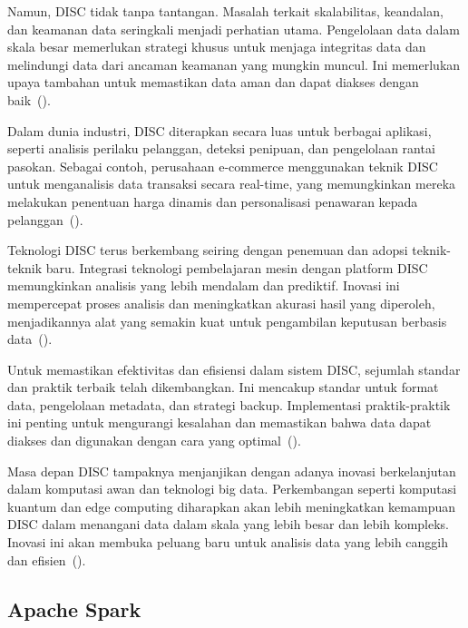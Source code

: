 Namun, DISC tidak tanpa tantangan. Masalah terkait skalabilitas, keandalan, dan keamanan data seringkali menjadi perhatian utama. Pengelolaan data dalam skala besar memerlukan strategi khusus untuk menjaga integritas data dan melindungi data dari ancaman keamanan yang mungkin muncul. Ini memerlukan upaya tambahan untuk memastikan data aman dan dapat diakses dengan baik~(\cite{hadoop2017}).

Dalam dunia industri, DISC diterapkan secara luas untuk berbagai aplikasi, seperti analisis perilaku pelanggan, deteksi penipuan, dan pengelolaan rantai pasokan. Sebagai contoh, perusahaan e-commerce menggunakan teknik DISC untuk menganalisis data transaksi secara real-time, yang memungkinkan mereka melakukan penentuan harga dinamis dan personalisasi penawaran kepada pelanggan~(\cite{chen2018}).

Teknologi DISC terus berkembang seiring dengan penemuan dan adopsi teknik-teknik baru. Integrasi teknologi pembelajaran mesin dengan platform DISC memungkinkan analisis yang lebih mendalam dan prediktif. Inovasi ini mempercepat proses analisis dan meningkatkan akurasi hasil yang diperoleh, menjadikannya alat yang semakin kuat untuk pengambilan keputusan berbasis data~(\cite{xu2020}).

Untuk memastikan efektivitas dan efisiensi dalam sistem DISC, sejumlah standar dan praktik terbaik telah dikembangkan. Ini mencakup standar untuk format data, pengelolaan metadata, dan strategi backup. Implementasi praktik-praktik ini penting untuk mengurangi kesalahan dan memastikan bahwa data dapat diakses dan digunakan dengan cara yang optimal~(\cite{rodriguez2019}).

Masa depan DISC tampaknya menjanjikan dengan adanya inovasi berkelanjutan dalam komputasi awan dan teknologi big data. Perkembangan seperti komputasi kuantum dan edge computing diharapkan akan lebih meningkatkan kemampuan DISC dalam menangani data dalam skala yang lebih besar dan lebih kompleks. Inovasi ini akan membuka peluang baru untuk analisis data yang lebih canggih dan efisien~(\cite{biau2023}).


\subsection{Apache Spark}

